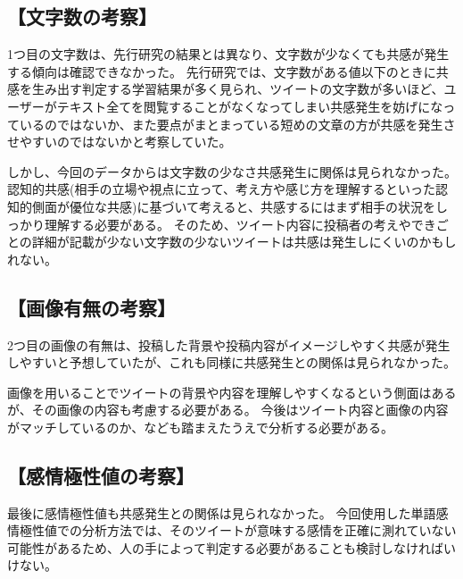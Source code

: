 \documentclass[dvipdfmx]{issj}
\begin{document}
\subsection{【文字数の考察】}  %
1つ目の文字数は、先行研究の結果とは異なり、文字数が少なくても共感が発生する傾向は確認できなかった。
先行研究では、文字数がある値以下のときに共感を生み出す判定する学習結果が多く見られ、ツイートの文字数が多いほど、ユーザーがテキスト全てを閲覧することがなくなってしまい共感発生を妨げになっているのではないか、また要点がまとまっている短めの文章の方が共感を発生させやすいのではないかと考察していた。

しかし、今回のデータからは文字数の少なさ共感発生に関係は見られなかった。
認知的共感(相手の立場や視点に立って、考え方や感じ方を理解するといった認知的側面が優位な共感)に基づいて考えると、共感するにはまず相手の状況をしっかり理解する必要がある。
そのため、ツイート内容に投稿者の考えやできごとの詳細が記載が少ない文字数の少ないツイートは共感は発生しにくいのかもしれない。

\subsection{【画像有無の考察】}  %
2つ目の画像の有無は、投稿した背景や投稿内容がイメージしやすく共感が発生しやすいと予想していたが、これも同様に共感発生との関係は見られなかった。

画像を用いることでツイートの背景や内容を理解しやすくなるという側面はあるが、その画像の内容も考慮する必要がある。
今後はツイート内容と画像の内容がマッチしているのか、なども踏まえたうえで分析する必要がある。

\subsection{【感情極性値の考察】}  %
最後に感情極性値も共感発生との関係は見られなかった。
今回使用した単語感情極性値での分析方法では、そのツイートが意味する感情を正確に測れていない可能性があるため、人の手によって判定する必要があることも検討しなければいけない。
\end{document}
